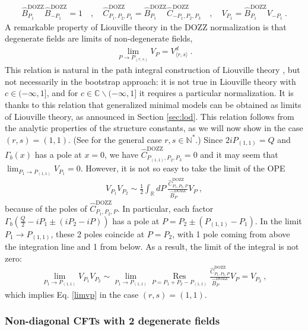 \documentclass[12pt, a4paper]{article}
\theoremstyle{break}
\begin{document}
\begin{align}
 \hat B^\text{DOZZ}_{P_1}\hat B^\text{DOZZ}_{-P_1}=1 \quad , \quad  \hat C^\text{DOZZ}_{P_1,P_2,P_3} = \hat B^\text{DOZZ}_{P_1}\hat C^\text{DOZZ}_{-P_1,P_2,P_3} \quad , \quad V_{P_1} = \hat B^\text{DOZZ}_{P_1} V_{-P_1}\ . 
\end{align}
A remarkable property of Liouville theory in the DOZZ normalization is that degenerate fields are limits of non-degenerate fields,
\begin{align}
 \lim_{P\to P_{(r,s)}} V_P = V^d_{\langle r,s\rangle} \ .
 \label{limvp}
\end{align}
This relation is natural in the path integral construction of Liouville theory \cite{zz95}, but not necessarily in the bootstrap approach: it is not true in Liouville theory with $c\in (-\infty, 1]$, and for $c\in\mathbb{C}\backslash (-\infty,1]$ it requires a particular normalization. It is thanks to this relation that generalized minimal models can be obtained as limits of Liouville theory, as announced in Section \ref{sec:lod}. This relation follows from the analytic properties of the structure constants, as we will now show in the case $(r,s)=(1,1)$. (See \cite[Section 3.1.5]{rib14} for the general case $r,s\in\mathbb{N}^*$.) Since $2iP_{(1,1)}=Q$ and $\Gamma_b(x)$ has a pole at $x=0$, we have $\hat C^\text{DOZZ}_{P_{(1,1)},P_2,P_3} = 0$ and it may seem that $\lim_{P_1\to P_{(1,1)}} V_{P_1} = 0$. However, it is not so easy to take the limit of the OPE 
\begin{align}
V_{P_1}V_{P_2} \sim \frac12 \int_{\mathbb{R}}dP\ \frac{\hat C^\text{DOZZ}_{P_1,P_2,P}}{\hat B^\text{DOZZ}_{P}}V_P\ , 
\end{align}
because of the poles of $\hat C^\text{DOZZ}_{P_1,P_2,P}$. In particular, each factor $\Gamma_b(\frac{Q}{2}-iP_1\pm (iP_2-iP))$ has a pole at $P= P_2\pm (P_{(1,1)}-P_1)$. In the limit $P_1\to P_{(1,1)}$, these 2 poles coincide at $P=P_2$, with 1 pole coming from above the integration line and 1 from below. As a result, the limit of the integral is not zero: 
\begin{align}
 \lim_{P_1\to P_{(1,1)}}V_{P_1}V_{P_2} \sim \lim_{P_1\to P_{(1,1)}}  \underset{P=P_1+P_2-P_{(1,1)}}{\operatorname{Res}}\frac{\hat C^\text{DOZZ}_{P_1,P_2,P}}{\hat B^\text{DOZZ}_{P}}V_P=V_{P_2}\ ,
\end{align}
which implies Eq. \eqref{limvp} in the case $(r,s)=(1,1)$. 

\subsubsection{Non-diagonal CFTs with 2 degenerate fields}
\end{document}
